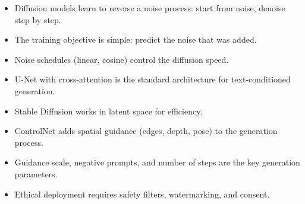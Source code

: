 \begin{itemize}
  \item Diffusion models learn to reverse a noise process: start from noise, denoise step by step.
  \item The training objective is simple: predict the noise that was added.
  \item Noise schedules (linear, cosine) control the diffusion speed.
  \item U-Net with cross-attention is the standard architecture for text-conditioned generation.
  \item Stable Diffusion works in latent space for efficiency.
  \item ControlNet adds spatial guidance (edges, depth, pose) to the generation process.
  \item Guidance scale, negative prompts, and number of steps are the key generation parameters.
  \item Ethical deployment requires safety filters, watermarking, and consent.
\end{itemize}
